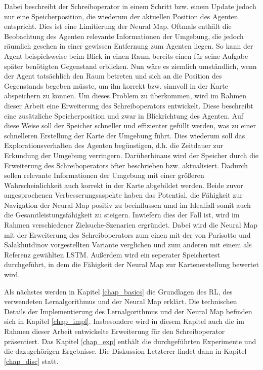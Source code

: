 Dabei beschreibt der Schreiboperator in einem Schritt bzw. einem Update jedoch nur eine Speicherposition, die wiederum der aktuellen Position des Agenten entspricht. Dies ist eine Limitierung der Neural Map. Oftmals enthält die Beobachtung des Agenten relevante Informationen der Umgebung, die jedoch räumlich gesehen in einer gewissen Entfernung zum Agenten liegen. So kann der Agent beispielsweise beim Blick in einen Raum bereits einen für seine Aufgabe später benötigten Gegenstand erblicken. Nun wäre es ziemlich umständlich, wenn der Agent tatsächlich den Raum betreten und sich an die Position des Gegenstands begeben müsste, um ihn korrekt bzw. sinnvoll in der Karte abspeichern zu können. Um dieses Problem zu überkommen, wird im Rahmen dieser Arbeit eine Erweiterung des Schreiboperators entwickelt. Diese beschreibt eine zusätzliche Speicherposition und zwar in Blickrichtung des Agenten. Auf diese Weise soll der Speicher schneller und effizienter gefüllt werden, was zu einer schnelleren Erstellung der Karte der Umgebung führt. Dies wiederum soll das Explorationsverhalten des Agenten begünstigen, d.h. die Zeitdauer zur Erkundung der Umgebung verringern. Darüberhinaus wird der Speicher durch die Erweiterung des Schreiboperators öfter beschrieben bzw. aktualisiert. Dadurch sollen relevante Informationen der Umgebung mit einer größeren Wahrscheinlichkeit auch korrekt in der Karte abgebildet werden. Beide zuvor angesprochenen Verbesserungsaspekte haben das Potential, die Fähigkeit zur Navigation der Neural Map positiv zu beeinflussen umd im Idealfall somit auch die Gesamtleistungsfähigkeit zu steigern. Inwiefern dies der Fall ist, wird im Rahmen verschiedener Zielsuche-Szenarien ergründet. Dabei wird die Neural Map mit der Erweiterung des Schreiboperators zum einen mit der von Parisotto und Salakhutdinov vorgestellten Variante verglichen und zum anderen mit einem als Referenz gewählten LSTM. Außerdem wird ein seperater Speichertest durchgeführt, in dem die Fähigkeit der Neural Map zur Kartenerstellung bewertet wird.

Als nächstes werden in Kapitel \ref{chap_basics} die Grundlagen des \ac{RL}, des verwendeten Lernalgorithmus und der Neural Map erklärt. Die technischen Details der Implementierung des Lernalgorithmus und der Neural Map befinden sich in Kapitel \ref{chap_impl}. Insbesondere wird in diesem Kapitel auch die im Rahmen dieser Arbeit entwickelte Erweiterung für den Schreiboperator präsentiert. Das Kapitel \ref{chap_exp} enthält die durchgeführten Experimente und die dazugehörigen Ergebnisse. Die Diskussion Letzterer findet dann in Kapitel \ref{chap_disc} statt.

















